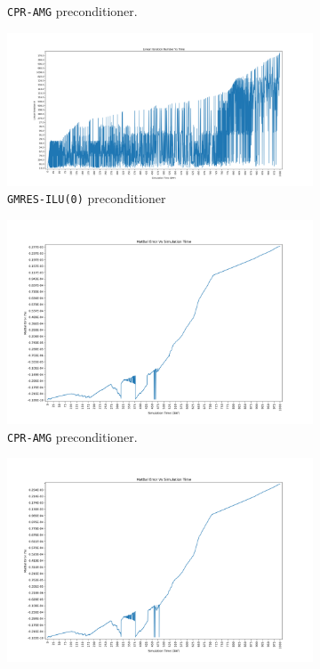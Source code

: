 \begin{figure}
\begin{subfigure}{.5\textwidth}
  \caption{\texttt{CPR-AMG} preconditioner.}
	\label{case9_its_cpr}
\end{subfigure}%
\begin{subfigure}{.5\textwidth}
  \centering
  \includegraphics[width=1.1\linewidth]{figures/case9/ilu/its_time.png_reduced.png}
  \caption{\texttt{GMRES-ILU(0)} preconditioner}
	\label{case9_its_ilu}
\end{subfigure}
\begin{subfigure}{.5\textwidth}
  \centering
  \includegraphics[width=1.1\linewidth]{figures/case9/cpr/matbalerr_time.png_reduced.png}
  \caption{\texttt{CPR-AMG} preconditioner.}
	\label{case9_matbalerr_cpr}
\end{subfigure}%
\begin{subfigure}{.5\textwidth}
  \centering
  \includegraphics[width=1.1\linewidth]{figures/case9/ilu/matbalerr_time.png_reduced.png}

\end{subfigure}
\end{figure}
